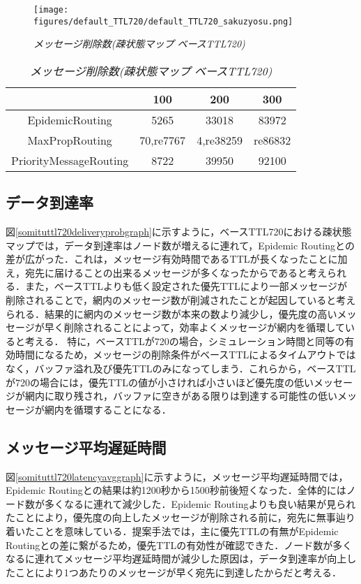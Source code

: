 \documentclass[11pt]{icsthesis}
\begin{document}
\begin{figure}[h]
\centering
\texttt{[image: figures/default\_TTL720/default\_TTL720\_sakuzyosu.png]}
\caption[]{\it{メッセージ削除数(疎状態マップ ベースTTL720)}}
\label{somituttl720droppedgraph}
\end{figure}

\begin{table}[H]
 \begin{center}
      \caption[]{\it{メッセージ削除数(疎状態マップ ベースTTL720)}}
      \label{somituTtl720dropped}
      \begin{tabular}{|c|c|c|c|}
\hline
&100&200&300\\
\hline
EpidemicRouting&5265&33018&83972\\
\hline
MaxPropRouting&70,re7767&4,re38259&re86832\\
\hline
PriorityMessageRouting&8722&39950&92100\\
\hline
      \end{tabular}
    \end{center}
\end{table}

\subsection{データ到達率}
図\ref{somituttl720deliveryprobgraph}に示すように，ベースTTL720における疎状態マップでは，データ到達率はノード数が増えるに連れて，Epidemic Routingとの差が広がった．これは，メッセージ有効時間であるTTLが長くなったことに加え，宛先に届けることの出来るメッセージが多くなったからであると考えられる．また，ベースTTLよりも低く設定された優先TTLにより一部メッセージが削除されることで，網内のメッセージ数が削減されたことが起因していると考えられる．結果的に網内のメッセージ数が本来の数より減少し，優先度の高いメッセージが早く削除されることによって，効率よくメッセージが網内を循環していると考える．
特に，ベースTTLが720の場合，シミュレーション時間と同等の有効時間になるため，メッセージの削除条件がベースTTLによるタイムアウトではなく，バッファ溢れ及び優先TTLのみになってしまう．これらから，ベースTTLが720の場合には，優先TTLの値が小さければ小さいほど優先度の低いメッセージが網内に取り残され，バッファに空きがある限りは到達する可能性の低いメッセージが網内を循環することになる．

\subsection{メッセージ平均遅延時間}
図\ref{somituttl720latencyavggraph}に示すように，メッセージ平均遅延時間では，Epidemic Routingとの結果は約1200秒から1500秒前後短くなった．全体的にはノード数が多くなるに連れて減少した．Epidemic Routingよりも良い結果が見られたことにより，優先度の向上したメッセージが削除される前に，宛先に無事辿り着いたことを意味している．提案手法では，主に優先TTLの有無がEpidemic Routingとの差に繋がるため，優先TTLの有効性が確認できた．ノード数が多くなるに連れてメッセージ平均遅延時間が減少した原因は，データ到達率が向上したことにより1つあたりのメッセージが早く宛先に到達したからだと考える．
\end{document}
